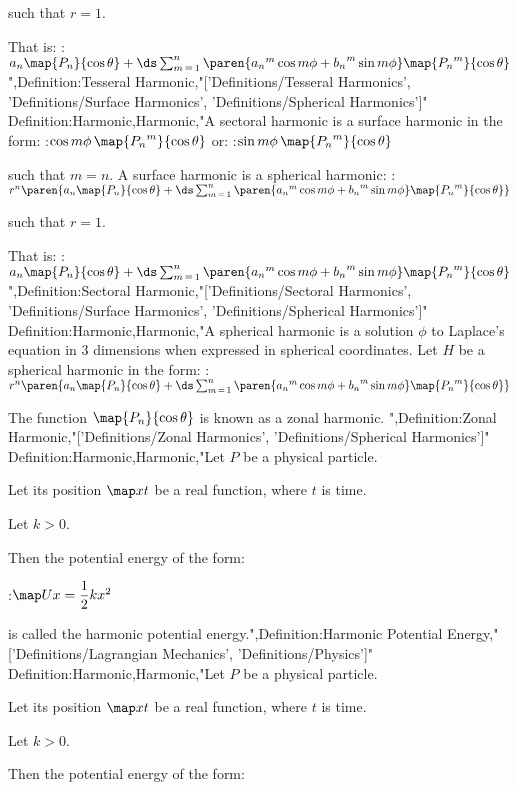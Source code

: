 such that $r = 1$.

That is:
:$a_n \map {P_n} {\cos \theta} + \ds \sum_{m \mathop = 1}^n \paren { {a_n}^m \cos m \phi + {b_n}^m \sin m \phi} \map { {P_n}^m} {\cos \theta}$
",Definition:Tesseral Harmonic,"['Definitions/Tesseral Harmonics', 'Definitions/Surface Harmonics', 'Definitions/Spherical Harmonics']"
Definition:Harmonic,Harmonic,"A sectoral harmonic is a surface harmonic in the form:
:$\cos m \phi \, \map { {P_n}^m} {\cos \theta}$
or:
:$\sin m \phi \, \map { {P_n}^m} {\cos \theta}$

such that $m = n$.
A surface harmonic is a spherical harmonic:
:$r^n \paren {a_n \map {P_n} {\cos \theta} + \ds \sum_{m \mathop = 1}^n \paren { {a_n}^m \cos m \phi + {b_n}^m \sin m \phi} \map { {P_n}^m} {\cos \theta} }$

such that $r = 1$.

That is:
:$a_n \map {P_n} {\cos \theta} + \ds \sum_{m \mathop = 1}^n \paren { {a_n}^m \cos m \phi + {b_n}^m \sin m \phi} \map { {P_n}^m} {\cos \theta}$
",Definition:Sectoral Harmonic,"['Definitions/Sectoral Harmonics', 'Definitions/Surface Harmonics', 'Definitions/Spherical Harmonics']"
Definition:Harmonic,Harmonic,"A spherical harmonic is a solution $\phi$ to Laplace's equation in $3$ dimensions when expressed in spherical coordinates.
Let $H$ be a spherical harmonic in the form:
:$r^n \paren {a_n \map {P_n} {\cos \theta} + \ds \sum_{m \mathop = 1}^n \paren { {a_n}^m \cos m \phi + {b_n}^m \sin m \phi} \map { {P_n}^m} {\cos \theta} }$

The function $\map {P_n} {\cos \theta}$ is known as a zonal harmonic.
",Definition:Zonal Harmonic,"['Definitions/Zonal Harmonics', 'Definitions/Spherical Harmonics']"
Definition:Harmonic,Harmonic,"Let $P$ be a physical particle.

Let its position $\map x t$ be a real function, where $t$ is time.

Let $k > 0$.


Then the potential energy of the form:

:$\map U x = \dfrac 1 2 k x^2$

is called the harmonic potential energy.",Definition:Harmonic Potential Energy,"['Definitions/Lagrangian Mechanics', 'Definitions/Physics']"
Definition:Harmonic,Harmonic,"Let $P$ be a physical particle.

Let its position $\map x t$ be a real function, where $t$ is time.

Let $k > 0$.


Then the potential energy of the form:


